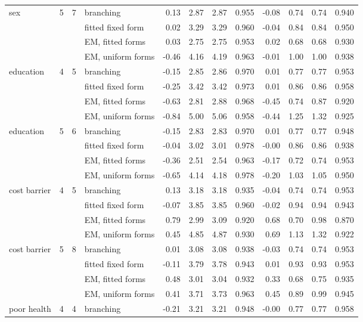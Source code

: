 \begin{table}[h]
\begin{tabular}{lrrlrrrrrrrr}
sex & 5 & 7 & branching & 0.13 & 2.87 & 2.87 & 0.955 & -0.08 & 0.74 & 0.74 & 0.940 \\
 &  &  & fitted fixed form & 0.02 & 3.29 & 3.29 & 0.960 & -0.04 & 0.84 & 0.84 & 0.950 \\
 &  &  & EM, fitted forms & 0.03 & 2.75 & 2.75 & 0.953 & 0.02 & 0.68 & 0.68 & 0.930 \\
 &  &  & EM, uniform forms & -0.46 & 4.16 & 4.19 & 0.963 & -0.01 & 1.00 & 1.00 & 0.938 \\
education & 4 & 5 & branching & -0.15 & 2.85 & 2.86 & 0.970 & 0.01 & 0.77 & 0.77 & 0.953 \\
 &  &  & fitted fixed form & -0.25 & 3.42 & 3.42 & 0.973 & 0.01 & 0.86 & 0.86 & 0.958 \\
 &  &  & EM, fitted forms & -0.63 & 2.81 & 2.88 & 0.968 & -0.45 & 0.74 & 0.87 & 0.920 \\
 &  &  & EM, uniform forms & -0.84 & 5.00 & 5.06 & 0.958 & -0.44 & 1.25 & 1.32 & 0.925 \\
education & 5 & 6 & branching & -0.15 & 2.83 & 2.83 & 0.970 & 0.01 & 0.77 & 0.77 & 0.948 \\
 &  &  & fitted fixed form & -0.04 & 3.02 & 3.01 & 0.978 & -0.00 & 0.86 & 0.86 & 0.938 \\
 &  &  & EM, fitted forms & -0.36 & 2.51 & 2.54 & 0.963 & -0.17 & 0.72 & 0.74 & 0.953 \\
 &  &  & EM, uniform forms & -0.65 & 4.14 & 4.18 & 0.978 & -0.20 & 1.03 & 1.05 & 0.950 \\
cost barrier & 4 & 5 & branching & 0.13 & 3.18 & 3.18 & 0.935 & -0.04 & 0.74 & 0.74 & 0.953 \\
 &  &  & fitted fixed form & -0.07 & 3.85 & 3.85 & 0.960 & -0.02 & 0.94 & 0.94 & 0.943 \\
 &  &  & EM, fitted forms & 0.79 & 2.99 & 3.09 & 0.920 & 0.68 & 0.70 & 0.98 & 0.870 \\
 &  &  & EM, uniform forms & 0.45 & 4.85 & 4.87 & 0.930 & 0.69 & 1.13 & 1.32 & 0.922 \\
cost barrier & 5 & 8 & branching & 0.01 & 3.08 & 3.08 & 0.938 & -0.03 & 0.74 & 0.74 & 0.953 \\
 &  &  & fitted fixed form & -0.11 & 3.79 & 3.78 & 0.943 & 0.01 & 0.93 & 0.93 & 0.953 \\
 &  &  & EM, fitted forms & 0.48 & 3.01 & 3.04 & 0.932 & 0.33 & 0.68 & 0.75 & 0.935 \\
 &  &  & EM, uniform forms & 0.41 & 3.71 & 3.73 & 0.963 & 0.45 & 0.89 & 0.99 & 0.945 \\
poor health & 4 & 4 & branching & -0.21 & 3.21 & 3.21 & 0.948 & -0.00 & 0.77 & 0.77 & 0.958 \\

\end{tabular}
\end{table}

